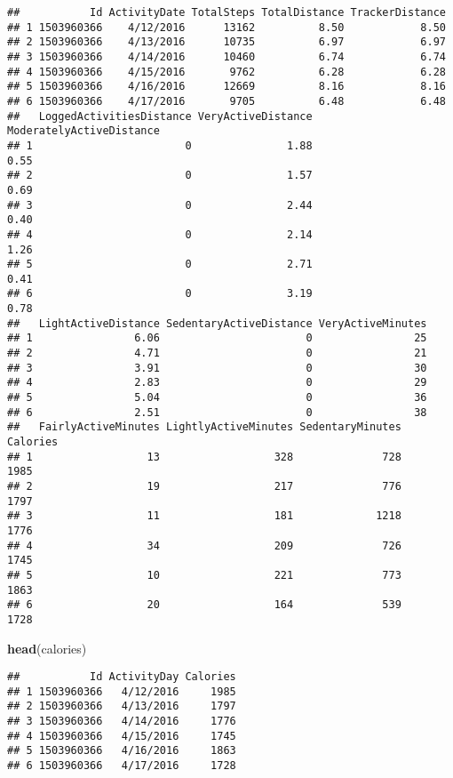 \documentclass[
]{article}
\newenvironment{Shaded}{\begin{snugshade}}{\end{snugshade}}
\newcommand{\FunctionTok}[1]{\textcolor[rgb]{0.13,0.29,0.53}{\textbf{#1}}}
\newcommand{\NormalTok}[1]{#1}
\begin{document}
\begin{verbatim}
##           Id ActivityDate TotalSteps TotalDistance TrackerDistance
## 1 1503960366    4/12/2016      13162          8.50            8.50
## 2 1503960366    4/13/2016      10735          6.97            6.97
## 3 1503960366    4/14/2016      10460          6.74            6.74
## 4 1503960366    4/15/2016       9762          6.28            6.28
## 5 1503960366    4/16/2016      12669          8.16            8.16
## 6 1503960366    4/17/2016       9705          6.48            6.48
##   LoggedActivitiesDistance VeryActiveDistance ModeratelyActiveDistance
## 1                        0               1.88                     0.55
## 2                        0               1.57                     0.69
## 3                        0               2.44                     0.40
## 4                        0               2.14                     1.26
## 5                        0               2.71                     0.41
## 6                        0               3.19                     0.78
##   LightActiveDistance SedentaryActiveDistance VeryActiveMinutes
## 1                6.06                       0                25
## 2                4.71                       0                21
## 3                3.91                       0                30
## 4                2.83                       0                29
## 5                5.04                       0                36
## 6                2.51                       0                38
##   FairlyActiveMinutes LightlyActiveMinutes SedentaryMinutes Calories
## 1                  13                  328              728     1985
## 2                  19                  217              776     1797
## 3                  11                  181             1218     1776
## 4                  34                  209              726     1745
## 5                  10                  221              773     1863
## 6                  20                  164              539     1728
\end{verbatim}

\begin{Shaded}
\begin{Highlighting}[]
\FunctionTok{head}\NormalTok{(calories)}
\end{Highlighting}
\end{Shaded}

\begin{verbatim}
##           Id ActivityDay Calories
## 1 1503960366   4/12/2016     1985
## 2 1503960366   4/13/2016     1797
## 3 1503960366   4/14/2016     1776
## 4 1503960366   4/15/2016     1745
## 5 1503960366   4/16/2016     1863
## 6 1503960366   4/17/2016     1728
\end{verbatim}
\end{document}
